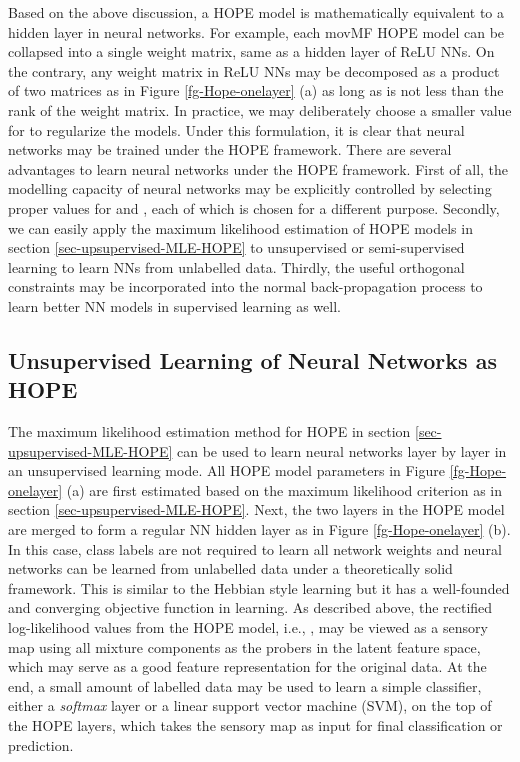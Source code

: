 \documentclass[11pt]{article}
\begin{document}
Based on the above discussion, a HOPE model is mathematically equivalent to a hidden layer in neural networks. For example,  each movMF HOPE model can be collapsed into a single weight matrix, same as a hidden layer of ReLU NNs. On the contrary, any weight matrix in ReLU NNs may be decomposed as a product of two matrices as in Figure \ref{fg-Hope-onelayer} (a) as long as  is not less than the rank of the weight matrix. In practice, we may deliberately choose a smaller value for  to regularize the models. 
Under this formulation, it is clear that neural networks may be trained under the HOPE framework.
There are several advantages to learn neural networks under the HOPE framework. First of all, the modelling capacity of neural networks may be explicitly controlled by selecting proper values for  and , each of which is chosen for a different purpose. 
Secondly, we can easily apply the maximum likelihood estimation of HOPE models in section \ref{sec-upsupervised-MLE-HOPE}
to unsupervised or semi-supervised learning to learn NNs from unlabelled data. Thirdly, the useful orthogonal constraints may be incorporated into the normal back-propagation process to learn better NN models in supervised learning as well. 

\subsection{Unsupervised Learning of Neural Networks as HOPE}
\label{subsec-unsupervisedlearning-NN-HOPE}

The maximum likelihood estimation method for HOPE in section \ref{sec-upsupervised-MLE-HOPE} can be used to learn neural networks layer by layer in an unsupervised learning mode. All HOPE model parameters in Figure \ref{fg-Hope-onelayer} (a) are first estimated based on the maximum likelihood criterion as in section \ref{sec-upsupervised-MLE-HOPE}. Next, the two layers in the HOPE model are merged to form a regular NN hidden layer as in Figure \ref{fg-Hope-onelayer} (b). In this case, class labels are not required to learn all network weights and neural networks can be learned from unlabelled data under a theoretically solid framework. This is similar to the Hebbian style learning \cite{EdmundRolls98} but it has a well-founded and converging objective function in learning. As described above, the rectified log-likelihood values from the HOPE model, i.e., ,  may be viewed as a sensory map using all mixture components as the probers in the latent feature space, which may serve as a good feature representation for the original data.
At the end, a small amount of labelled data may be used to learn a simple classifier, either a {\em softmax} layer or a linear support vector machine (SVM), on the top of the HOPE layers, which takes the sensory map as input for final classification or prediction.
\end{document}
